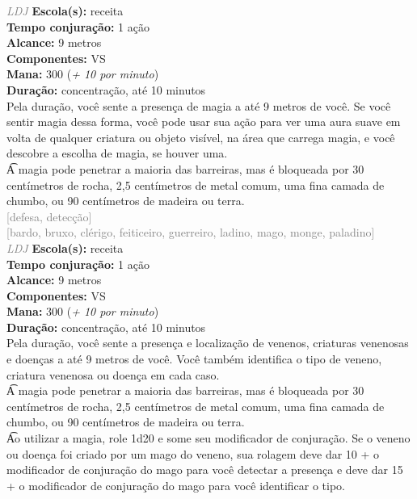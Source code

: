 \documentclass{RPG_Adventure}[2021/10/20]
\begin{document}
{\tiny \textcolor{gray}{\textit{LDJ}}}
{\small \t \textbf{Escola(s):} receita\\\t \textbf{Tempo conjuração:} 1 ação\\\t \textbf{Alcance:} 9 metros\\\t \textbf{Componentes:} VS\\\t \textbf{Mana:} 300 (\textit{+ 10 por minuto})\\\t \textbf{Duração:} concentração, até 10 minutos\\}
{\normalsize Pela duração, você sente a presença de magia a até 9 metros de você. Se você sentir magia dessa forma, você pode usar sua ação para ver uma aura suave em volta de qualquer criatura ou objeto visível, na área que carrega magia, e você descobre a escolha de magia, se houver uma.\\\t A magia pode penetrar a maioria das barreiras, mas é bloqueada por 30 centímetros de rocha, 2,5 centímetros de metal comum, uma fina camada de chumbo, ou 90 centímetros de madeira ou terra.\\}
{\scriptsize \textcolor{gray}{[defesa, detecção]\\}}
{\scriptsize \textcolor{gray}{[bardo, bruxo, clérigo, feiticeiro, guerreiro, ladino, mago, monge, paladino]\\}}
{\tiny \textcolor{gray}{\textit{LDJ}}}
{\small \t \textbf{Escola(s):} receita\\\t \textbf{Tempo conjuração:} 1 ação\\\t \textbf{Alcance:} 9 metros\\\t \textbf{Componentes:} VS\\\t \textbf{Mana:} 300 (\textit{+ 10 por minuto})\\\t \textbf{Duração:} concentração, até 10 minutos\\}
{\normalsize Pela duração, você sente a presença e localização de venenos, criaturas venenosas e doenças a até 9 metros de você. Você também identifica o tipo de veneno, criatura venenosa ou doença em cada caso.\\\t A magia pode penetrar a maioria das barreiras, mas é bloqueada por 30 centímetros de rocha, 2,5 centímetros de metal comum, uma fina camada de chumbo, ou 90 centímetros de madeira ou terra.\\\t Ao utilizar a magia, role 1d20 e some seu modificador de conjuração. Se o veneno ou doença foi criado por um mago do veneno, sua rolagem deve dar 10 + o modificador de conjuração do mago para você detectar a presença e deve dar 15 + o modificador de conjuração do mago para você identificar o tipo.\\}
\end{document}
